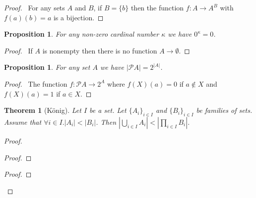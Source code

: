 \documentclass{book}
\let\qed\relax
\newtheorem{prop}[ax]{Proposition}
\newtheorem{thm}[ax]{Theorem}
\theoremstyle{definition}
\newcommand{\ran}{\ensuremath{\operatorname{ran}}}
\begin{document}
\begin{proof}
\pf\ For any sets $A$ and $B$, if $B = \{b\}$ then the function $f : A \rightarrow A^B$ with $f(a)(b) = a$ is a bijection. \qed
\end{proof}

\begin{prop}
For any non-zero cardinal number $\kappa$ we have $0^\kappa = 0$.
\end{prop}

\begin{proof}
\pf\ If $A$ is nonempty then there is no function $A \rightarrow \emptyset$. \qed
\end{proof}

\begin{prop}
For any set $A$ we have $|\mathcal{P} A| = 2^{|A|}$.
\end{prop}

\begin{proof}
\pf\ The function $f : \mathcal{P} A \rightarrow 2^A$ where $f(X)(a) = 0$ if $a \notin X$ and $f(X)(a) = 1$ if $a \in X$. \qed
\end{proof}

\begin{thm}[K\"{o}nig]
Let $I$ be a set. Let $\{A_i\}_{i \in I}$ and $\{B_i\}_{i \in I}$ be families of sets. Assume that $\forall i \in I. |A_i| < |B_i|$. Then $\left| \bigcup_{i \in I} A_i \right| < \left| \prod_{i \in I} B_i \right|$.
\end{thm}

\begin{proof}
\pf
{}
\begin{proof}
\end{proof}
\begin{proof}
	\step{d}{$c \notin \ran h$}
\end{proof}
\qed
\end{proof}
\end{document}
